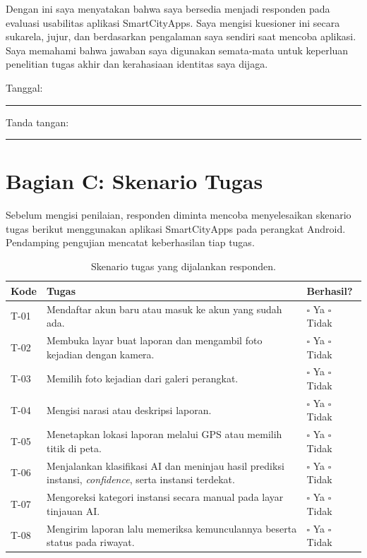 Dengan ini saya menyatakan bahwa saya bersedia menjadi responden pada evaluasi usabilitas aplikasi SmartCityApps. Saya mengisi kuesioner ini secara sukarela, jujur, dan berdasarkan pengalaman saya sendiri saat mencoba aplikasi. Saya memahami bahwa jawaban saya digunakan semata-mata untuk keperluan penelitian tugas akhir dan kerahasiaan identitas saya dijaga.

\vspace{0.8cm}
\noindent Tanggal: \rule{3.5cm}{0.4pt} \hfill Tanda tangan: \rule{4cm}{0.4pt}

\section*{Bagian C: Skenario Tugas}

Sebelum mengisi penilaian, responden diminta mencoba menyelesaikan skenario tugas berikut menggunakan aplikasi SmartCityApps pada perangkat Android. Pendamping pengujian mencatat keberhasilan tiap tugas.

\begin{table}[htbp]
\centering
\small
\caption{Skenario tugas yang dijalankan responden.}
\label{tab:form-skenario}
\begin{tabular}{p{1.2cm} p{8.5cm} p{2.4cm}}
\toprule
\textbf{Kode} & \textbf{Tugas} & \textbf{Berhasil?} \\
\midrule
T-01 & Mendaftar akun baru atau masuk ke akun yang sudah ada. & $\square$ Ya \; $\square$ Tidak \\
T-02 & Membuka layar buat laporan dan mengambil foto kejadian dengan kamera. & $\square$ Ya \; $\square$ Tidak \\
T-03 & Memilih foto kejadian dari galeri perangkat. & $\square$ Ya \; $\square$ Tidak \\
T-04 & Mengisi narasi atau deskripsi laporan. & $\square$ Ya \; $\square$ Tidak \\
T-05 & Menetapkan lokasi laporan melalui GPS atau memilih titik di peta. & $\square$ Ya \; $\square$ Tidak \\
T-06 & Menjalankan klasifikasi AI dan meninjau hasil prediksi instansi, \textit{confidence}, serta instansi terdekat. & $\square$ Ya \; $\square$ Tidak \\
T-07 & Mengoreksi kategori instansi secara manual pada layar tinjauan AI. & $\square$ Ya \; $\square$ Tidak \\
T-08 & Mengirim laporan lalu memeriksa kemunculannya beserta status pada riwayat. & $\square$ Ya \; $\square$ Tidak \\
\bottomrule
\end{tabular}
\end{table}

